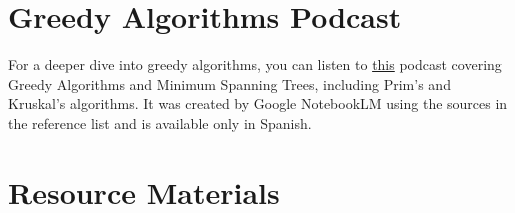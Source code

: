 \documentclass{article}
\begin{document}
\section{Greedy Algorithms Podcast}

For a deeper dive into greedy algorithms, you can listen to \href{https://drive.google.com/file/d/1B25NKQXEjpyLnhL9lyvlavMPsuure7Gv/view?usp=sharing}{this} podcast covering Greedy Algorithms and Minimum Spanning Trees, including Prim's and Kruskal's algorithms. It was created by Google NotebookLM using the sources in the reference list and is available only in Spanish.

\section{Resource Materials}
\end{document}
